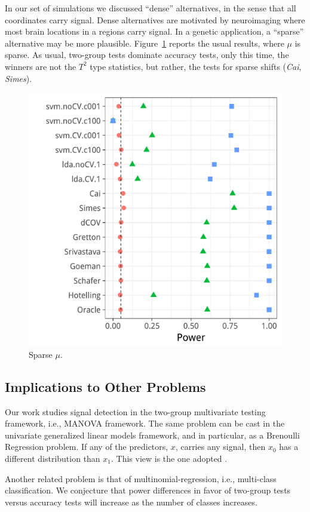 \documentclass[onecolumn,draftclsnofoot]{IEEEtran}
\begin{document}
In our set of simulations we discussed ``dense'' alternatives, in the sense that all coordinates carry signal.
Dense alternatives are motivated by neuroimaging where most brain locations in a regions carry signal.
In a genetic application, a ``sparse'' alternative may be more plausible. 
Figure~\ref{fig:sparse} reports the usual results, where $\mu$ is sparse. 
As usual, two-group tests dominate accuracy tests, only this time, the winners are not the $T^2$ type statistics, but rather, the tests for sparse shifts (\emph{Cai}, \emph{Simes}).

\begin{figure}[ht]
	\centering
	\label{fig:sparse}	
	\centering
	\includegraphics[width=0.7\columnwidth]{"art/file34"}
	\caption{Sparse $\mu$.}  
\end{figure}



\subsection{Implications to Other Problems}

Our work studies signal detection in the two-group multivariate testing framework, i.e., MANOVA framework.
The same problem can be cast in the univariate generalized linear models framework, and in particular, as a Brenoulli Regression problem.
If any of the predictors, $x$, carries any signal, then $x_0$ has a different distribution than $x_1$.
This view is the one adopted \cite{goeman2006testing}.

Another related problem is that of multinomial-regression, i.e., multi-class classification.
We conjecture that power differences in favor of two-group tests versus accuracy tests will increase as the number of classes increases.
\end{document}
